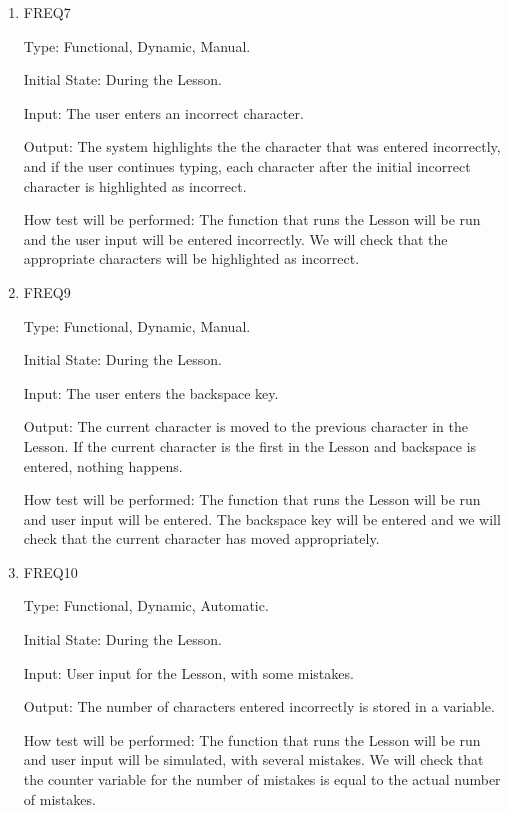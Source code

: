 \documentclass[12pt, titlepage]{article}
\begin{document}
\begin{enumerate}

\item{FREQ7\\}

Type: Functional, Dynamic, Manual.
					
Initial State: During the Lesson.
					
Input: The user enters an incorrect character.
					
Output: The system highlights the the character that was entered incorrectly, and if the user continues typing, each character after the initial incorrect character is highlighted as incorrect.
					
How test will be performed: The function that runs the Lesson will be run and the user input will be entered incorrectly. We will check that the appropriate characters will be highlighted as incorrect.

\item{FREQ9\\}

Type: Functional, Dynamic, Manual.
					
Initial State: During the Lesson.
					
Input: The user enters the backspace key.
					
Output: The current character is moved to the previous character in the Lesson. If the current character is the first in the Lesson and backspace is entered, nothing happens.
					
How test will be performed: The function that runs the Lesson will be run and user input will be entered. The backspace key will be entered and we will check that the current character has moved appropriately.

\item{FREQ10\\}
{\color{cyan}
Type: Functional, Dynamic, Automatic.
					
Initial State: During the Lesson.
					
Input: User input for the Lesson, with some mistakes.
					
Output: The number of characters entered incorrectly is stored in a variable.
					
How test will be performed: The function that runs the Lesson will be run and user input will be simulated, with several mistakes. We will check that the counter variable for the number of mistakes is equal to the actual number of mistakes.}
\end{enumerate}
\end{document}
